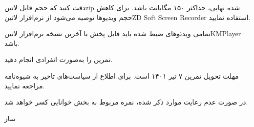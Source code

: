 \documentclass[]{assignment}
\begin{document}
 دقت کنید که حجم فایل ‌لاتین{zip} شده نهایی، حداکثر ۱۵۰ مگابایت باشد.
برای کاهش حجم ویدیو‌ها توصیه می‌شود از نرم‌افزار ‌لاتین{ZD Soft Screen Recorder} استفاده نمایید.

 تمامی ویدئوهای ضبط شده باید قابل پخش با آخرین نسخه نرم‌افزار ‌لاتین{KMPlayer} باشد.

 تمرین را به‌صورت انفرادی انجام دهید.

 مهلت تحویل تمرین ۷ تیر ۱۴۰۱ است. برای اطلاع از سیاست‌های تاخیر به شیوه‌نامه مراجعه نمایید.

 در صورت عدم رعایت موارد ذکر شده، نمره مربوط به بخش خوانایی کسر خواهد شد.


‌ساز
\end{document}
